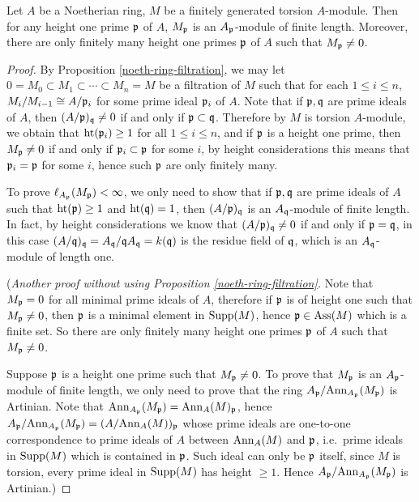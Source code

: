 \begin{prop}
\label{char-ideal-preliminary}
\leanok
Let $A$ be a Noetherian ring, $M$ be a
finitely generated torsion $A$-module.
Then for any height one prime ${\mathfrak{p}}$ of $A$,
$M_{\mathfrak{p}}$ is an $A_{\mathfrak{p}}$-module of finite length. Moreover, there are only finitely
many height one primes ${\mathfrak{p}}$ of $A$ such that $M_{\mathfrak{p}}\neq 0$.
\end{prop}

\begin{proof}
\leanok
By Proposition \ref{noeth-ring-filtration},
we may let $0=M_0\subset M_1\subset\cdots\subset M_n=M$ be a filtration of $M$
such that for each $1\leq i\leq n$,
$M_i/M_{i-1}\cong A/{\mathfrak{p}}_i$ for some prime ideal ${\mathfrak{p}}_i$ of $A$.
Note that if ${\mathfrak{p}},{\mathfrak{q}}$ are prime ideals of $A$,
then $(A/{\mathfrak{p}})_{\mathfrak{q}}\neq 0$ if and only if ${\mathfrak{p}}\subset{\mathfrak{q}}$.
Therefore by $M$ is torsion $A$-module, we obtain that ${\mathrm{ht}}({\mathfrak{p}}_i)\geq 1$
for all $1\leq i\leq n$,
and if ${\mathfrak{p}}$ is a height one prime, then $M_{\mathfrak{p}}\neq 0$
if and only if ${\mathfrak{p}}_i\subset{\mathfrak{p}}$ for some $i$,
by height considerations this means that ${\mathfrak{p}}_i={\mathfrak{p}}$ for some $i$,
hence such ${\mathfrak{p}}$ are only finitely many.

To prove $\ell_{A_{\mathfrak{p}}}(M_{\mathfrak{p}})<\infty$,
we only need to show that if ${\mathfrak{p}},{\mathfrak{q}}$ are prime ideals of $A$
such that ${\mathrm{ht}}({\mathfrak{p}})\geq 1$ and ${\mathrm{ht}}({\mathfrak{q}})=1$,
then $(A/{\mathfrak{p}})_{\mathfrak{q}}$ is an $A_{\mathfrak{q}}$-module of finite length.
In fact, by height considerations we know that $(A/{\mathfrak{p}})_{\mathfrak{q}}\neq 0$
if and only if ${\mathfrak{p}}={\mathfrak{q}}$, in this case $(A/{\mathfrak{q}})_{\mathfrak{q}}=A_{\mathfrak{q}}/{\mathfrak{q}} A_{\mathfrak{q}}
=k({\mathfrak{q}})$ is the residue field of ${\mathfrak{q}}$, which is
an $A_{\mathfrak{q}}$-module of length one.

(\emph{Another proof without using Proposition \ref{noeth-ring-filtration}.}
Note that $M_{\mathfrak{p}}=0$ for all minimal prime ideals of $A$,
therefore if ${\mathfrak{p}}$ is of height one such that $M_{\mathfrak{p}}\neq 0$,
then ${\mathfrak{p}}$ is a minimal element in ${\mathrm{Supp}}(M)$, hence ${\mathfrak{p}}\in\operatorname{Ass}(M)$
which is a finite set.
So there are only finitely
many height one primes ${\mathfrak{p}}$ of $A$ such that $M_{\mathfrak{p}}\neq 0$.

Suppose ${\mathfrak{p}}$ is a height one prime such that $M_{\mathfrak{p}}\neq 0$.
To prove that $M_{\mathfrak{p}}$ is an $A_{\mathfrak{p}}$-module of finite length,
we only need to prove that the ring $A_{\mathfrak{p}}/{\mathrm{Ann}}_{A_{\mathfrak{p}}}(M_{\mathfrak{p}})$
is Artinian. Note that ${\mathrm{Ann}}_{A_{\mathfrak{p}}}(M_{\mathfrak{p}})={\mathrm{Ann}}_A(M)_{\mathfrak{p}}$,
hence $A_{\mathfrak{p}}/{\mathrm{Ann}}_{A_{\mathfrak{p}}}(M_{\mathfrak{p}})=(A/{\mathrm{Ann}}_A(M))_{\mathfrak{p}}$
whose prime ideals are one-to-one correspondence to prime ideals
of $A$ between ${\mathrm{Ann}}_A(M)$ and ${\mathfrak{p}}$,
i.e.~prime ideals in ${\mathrm{Supp}}(M)$ which is contained in ${\mathfrak{p}}$.
Such ideal can only be ${\mathfrak{p}}$ itself,
since $M$ is torsion, every prime ideal in ${\mathrm{Supp}}(M)$ has height $\geq 1$.
Hence $A_{\mathfrak{p}}/{\mathrm{Ann}}_{A_{\mathfrak{p}}}(M_{\mathfrak{p}})$
is Artinian.)
\end{proof}

